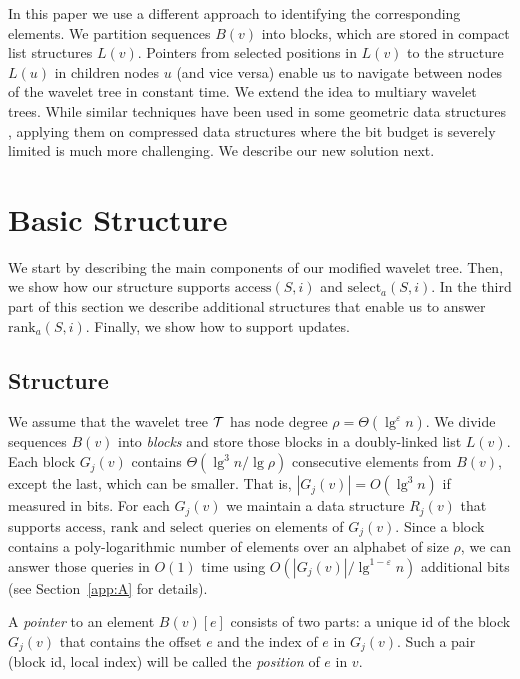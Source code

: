 \documentclass[11pt]{article}
\def\idrm#1{\ensuremath{\mathrm{#1}}}
\newcommand{\cT}{{\cal T}}
\newcommand{\ra}{\idrm{rank}}
\newcommand{\sel}{\idrm{select}}
\newcommand{\acc}{\idrm{access}}
\newcommand{\eps}{\varepsilon}
\begin{document}
In this paper we use a different approach to identifying the 
corresponding elements. We partition sequences $B(v)$ into blocks, which are stored
in compact list structures $L(v)$. Pointers from selected positions 
in $L(v)$ to the structure $L(u)$ in children nodes $u$ (and vice versa) 
enable us to navigate between nodes of the wavelet tree in constant time. We
extend the idea to multiary wavelet trees.
While similar techniques have been used in some geometric data structures 
\cite{N11,B08}, applying them on compressed data structures 
where the bit budget is severely limited  is much more challenging.
We describe our new solution next.


\section{Basic Structure}
\label{sec:basic}

We start by describing the main components of our modified 
wavelet tree. Then, we show how our structure supports 
$\acc(S,i)$ and $\sel_a(S,i)$. In the third part of this 
section we describe additional structures that enable us to 
answer $\ra_a(S,i)$. Finally, we show how to support updates. 

\subsection{Structure}

We assume that the wavelet tree $\cT$ has node degree $\rho=\Theta(\lg^{\eps}n)$. 
We divide sequences $B(v)$ into {\em blocks} and store those blocks 
 in a doubly-linked list $L(v)$.  
Each block $G_j(v)$ contains $\Theta(\lg^3 n/\lg\rho)$ consecutive 
elements from $B(v)$, except the last, which can be smaller.
That is, $|G_j(v)|=O(\lg^3 n)$ if measured in bits.
For each  $G_j(v)$ we maintain a data structure $R_j(v)$ that supports $\acc$, $\ra$ and $\sel$ queries on elements of $G_j(v)$. Since a block contains a poly-logarithmic 
number of elements over an alphabet of size $\rho$, we can answer those queries
in $O(1)$ time using $O(|G_j(v)|/\lg^{1-\eps} n)$ additional bits
(see Section~\ref{app:A} for details).

A \emph{pointer} to an element $B(v)[e]$ consists of two parts:
a unique id of the block $G_j(v)$ that contains the offset $e$ and 
the index of $e$ in $G_j(v)$. Such a pair (block id, local index) will be
called the {\em position} of $e$ in $v$.
\end{document}
